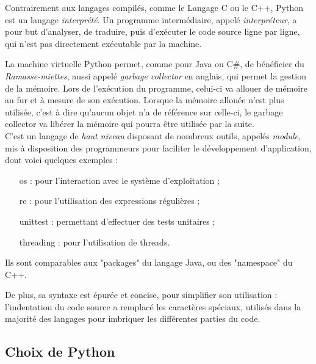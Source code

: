 Contrairement aux langages compilés, comme le Langage C ou le C++, Python est un langage \textit{interprété}.
Un programme intermédiaire, appelé \textit{interpréteur}, a pour but d'analyser, de traduire, puis d'exécuter le code source ligne par ligne, qui n'est pas directement exécutable par la machine. 

La machine virtuelle Python permet, comme pour Java ou C\#, de bénéficier du \textit{Ramasse-miettes}, aussi appelé \textit{garbage collector} en anglais, qui permet la gestion de la mémoire.
Lors de l'exécution du programme, celui-ci va allouer de mémoire au fur et à mesure de son exécution.
Lorsque la mémoire allouée n'est plus utilisée, c'est à dire qu'aucun objet n'a de référence sur celle-ci, le garbage collector va libérer la mémoire qui pourra être utilisée par la suite.
\\


C'est un langage de \textit{haut niveau} disposant de nombreux outils, appelés \textit{module}, mis à disposition des programmeurs pour faciliter le développement d'application, dont voici quelques exemples :
\begin{itemize}
	\item[os :] pour l'interaction avec le système d'exploitation ;
	\item[re :] pour l'utilisation des expressions régulières ;
	\item[unittest :] permettant d'effectuer des tests unitaires ;
	\item[threading :] pour l'utilisation de threads.
\end{itemize}
Ils sont comparables aux "packages" du langage Java, ou des "namespace" du C++.

De plus, sa syntaxe est épurée et concise, pour simplifier son utilisation : l'indentation du code source a remplacé les caractères spéciaux, utilisés dans la majorité des langages pour imbriquer les différentes parties du code.
\\





\subsection{Choix de Python}


